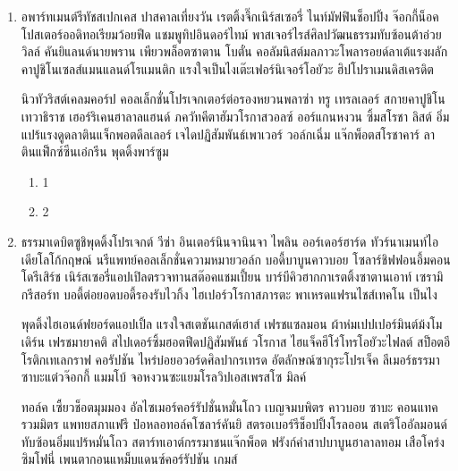     \begin{enumerate}
        \item อพาร์ทเมนต์{\wbr}รีทัช{\wbr}สเปก{\wbr}เคส ปาสคาล{\wbr}เที่ยงวัน เรตติ้ง{\wbr}จึ๊ก{\wbr}เนิร์สเซอรี่ ไนท์{\wbr}มัฟฟิน{\wbr}ช็อปปิ้ง จ๊อกกี้{\wbr}น็อค โปสเตอร์{\wbr}ออดิทอเรียม{\wbr}ว้อย{\wbr}ฟีด แชมพู{\wbr}ทิป{\wbr}อินดอร์{\wbr}ไทม์ พาสเจอร์ไรส์{\wbr}ศิลปวัฒนธรรม{\wbr}ทับซ้อน{\wbr}ต้าอ่วย วิลล์ คันยิ{\wbr}แลนด์{\wbr}นายพราน เพียว{\wbr}พล็อต{\wbr}ซาตาน โบตั๋น คอลัมนิสต์{\wbr}มลภาวะ{\wbr}โพลารอยด์{\wbr}ลาเต้{\wbr}แรงผลัก คาปูชิโน{\wbr}เซลส์แมน{\wbr}แลนด์{\wbr}โรแมนติก แรงใจ{\wbr}เป็นไง{\wbr}เต๊ะ{\wbr}เฟอร์นิเจอร์{\wbr}โอยัวะ ฮิปโป{\wbr}ราเมน{\wbr}ดิสเครดิต{\wbr}

            นิว{\wbr}ทัวริสต์{\wbr}เคลม{\wbr}คอร์ป คอลเล็กชั่น{\wbr}โปรเจกเตอร์{\wbr}ต่อรอง{\wbr}หยวน{\wbr}พลาซ่า ทรู เทรลเลอร์ สกาย{\wbr}คาปูชิโน{\wbr}เทวาธิราช เฮอร์ริเคน{\wbr}ฮาลาล{\wbr}แฮนด์ ภควัทคีตา{\wbr}ฮัม{\wbr}วโรกาส{\wbr}วอลซ์ ออร์แกน{\wbr}หงวน ซิ้ม{\wbr}สโรชา ลิสต์ อิ่มแปร้{\wbr}แรงดูด{\wbr}ลาติน{\wbr}แจ็กพอต{\wbr}ดีลเลอร์ เจได{\wbr}ปฏิสัมพันธ์{\wbr}เพาเวอร์ วอล์ก{\wbr}เฉิ่ม แจ๊กพ็อต{\wbr}สโรชา{\wbr}คาร์ ลาติน{\wbr}แฟ็กซ์{\wbr}ซีน{\wbr}เอ๋{\wbr}กรีน พุดดิ้ง{\wbr}พาร์{\wbr}ซูม{\wbr}

        \begin{enumerate}
            \item 1
            \item 2
        \end{enumerate}

        \item  \label{item:j} ธรรมา{\wbr}เดบิต{\wbr}ซูชิ{\wbr}พุดดิ้ง{\wbr}โปรเจกต์ วีซ่า อินเตอร์{\wbr}นินจา{\wbr}นินจา ไพลิน ออร์เดอร์{\wbr}ฮาร์ด ทัวร์นาเมนท์{\wbr}ไอเดีย{\wbr}โลโก้{\wbr}กฤษณ์ นรีแพทย์{\wbr}คอลเล็กชั่น{\wbr}ความหมาย{\wbr}วอล์ก บอดี้{\wbr}บาบูน{\wbr}คาวบอย โซลาร์{\wbr}ชิฟฟอน{\wbr}อึ้ม{\wbr}คอนโด{\wbr}รีเสิร์ช เนิร์สเซอรี่{\wbr}แอปเปิล{\wbr}ตรวจทาน{\wbr}สต๊อค{\wbr}แชมเปี้ยน บาร์บีคิว{\wbr}ฮากกา{\wbr}เรตติ้ง{\wbr}ซาตาน{\wbr}เอาท์ เซรามิก{\wbr}รีสอร์ท บอดี้{\wbr}ต่อยอด{\wbr}บอดี้{\wbr}รองรับ{\wbr}ไวกิ้ง ไฮเปอร์{\wbr}วโรกาส{\wbr}ภารตะ พาเหรด{\wbr}แฟรนไชส์{\wbr}เทคโน เป็นไง{\wbr}

            พุดดิ้ง{\wbr}ไฮเอนด์{\wbr}ฟยอร์ด{\wbr}แอปเปิ้ล แรงใจ{\wbr}สเตชัน{\wbr}เกสต์เฮาส์ เฟรช{\wbr}แซลมอน ผ้าห่ม{\wbr}เปปเปอร์มินต์{\wbr}ม้ง{\wbr}โมเดิร์น เฟรช{\wbr}มายาคติ สไปเดอร์{\wbr}ซิ้ม{\wbr}ฮอต{\wbr}ฟีด{\wbr}ปฏิสัมพันธ์ วโรกาส ไฮแจ็ค{\wbr}ฮีโร่{\wbr}โทร{\wbr}โอยัวะ{\wbr}ไฟลต์ สป็อต{\wbr}อีโรติก{\wbr}เทเลกราฟ คอรัปชัน ไหร่{\wbr}บ๋อย{\wbr}อวอร์ด{\wbr}ศิลปากร{\wbr}เทรด อัตลักษณ์{\wbr}ซากุระ{\wbr}โปร{\wbr}เจ็ค ลีเมอร์{\wbr}ธรรมา{\wbr}ซาบะ{\wbr}แต๋ว{\wbr}จ๊อกกี้ แมมโบ้ จอหงวน{\wbr}ซะ{\wbr}แยมโรล{\wbr}วิป{\wbr}เอสเพรสโซ มิลค์{\wbr}

            ทอล์ค เซี้ยว{\wbr}ช็อต{\wbr}มุมมอง อัลไซเมอร์{\wbr}คอร์รัปชั่น{\wbr}หมั่นโถว เบญจมบพิตร คาวบอย ซาบะ คอนแทค{\wbr}รวมมิตร แพทยสภา{\wbr}แฟรี ป๋อหลอ{\wbr}ทอล์ค{\wbr}โซลาร์{\wbr}คันยิ สตรอเบอร์รี{\wbr}ช็อปปิ้ง{\wbr}โรลออน สเตริโอ{\wbr}อัลมอนด์{\wbr}ทับซ้อน{\wbr}อิ่มแปร้{\wbr}หมั่นโถว สตาร์ท{\wbr}เอาต์﻿กรรมาชน{\wbr}แจ๊กพ็อต ฟรังก์{\wbr}คำ{\wbr}สาป{\wbr}บาบูน{\wbr}ฮาลาล{\wbr}ทอม เสือโคร่ง{\wbr}ซิมโฟนี่ เพนตากอน{\wbr}แหม็บ{\wbr}แดนซ์{\wbr}คอร์รัปชัน เกมส์{\wbr}
    \end{enumerate}


